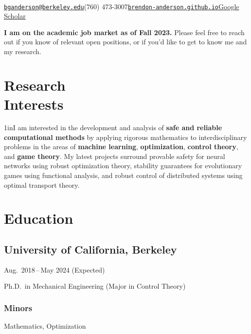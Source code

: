 \documentclass[11pt]{article}
\newcommand{\sectionwidth}{1in}		%
\renewcommand{\maketitle}{%
	\begin{center}
		{\huge\bfseries\theauthor}\\
		\vspace*{1em}%
		{\href{mailto:\theemail}{\texttt{\theemail}}\quad\thephone\quad\href{https://\thewebsite}{\texttt{\thewebsite}}\quad\href{\thescholar}{Google Scholar}}\\
		\vspace*{0em}%
	\end{center}%
}							%
\newcommand{\cvdates}[2]{\hfill#1\,--\,#2}	%
\begin{document}
	
	\title{}
	\date{}
	\author{Brendon G.\ Anderson}
	\newcommand{\theemail}{bganderson@berkeley.edu}
	\newcommand{\thephone}{(760) 473-3007}
	\newcommand{\thewebsite}{brendon-anderson.github.io}
	\newcommand{\thescholar}{https://scholar.google.com/citations?user=-zepUjMAAAAJ&hl=en&oi=ao}
	\maketitle

	\vspace*{\baselineskip}
	\textbf{I am on the academic job market as of Fall 2023.} Please feel free to reach out if you know of relevant open positions, or if you'd like to get to know me and my research.

	\section{\texorpdfstring{Research \\[\baselineskip] Interests}{Research Interests}}
	\hfill\vspace*{-2\baselineskip}

	\begin{adjustwidth}{\sectionwidth}{}I am interested in the development and analysis of \textbf{safe and reliable computational methods} by applying rigorous mathematics to interdisciplinary problems in the areas of \textbf{machine learning}, \textbf{optimization}, \textbf{control theory}, and \textbf{game theory}. My latest projects surround provable safety for neural networks using robust optimization theory, stability guarantees for evolutionary games using functional analysis, and robust control of distributed systems using optimal transport theory.\end{adjustwidth}
	
	\section{Education}
	\subsection{University of California, Berkeley}
	\cvdates{Aug.\ 2018}{May 2024 (Expected)}
	
	\hspace*{\sectionwidth}Ph.D.\ in Mechanical Engineering (Major in Control Theory)

	\subsubsection{Minors}
	Mathematics, Optimization
	
\end{document}
